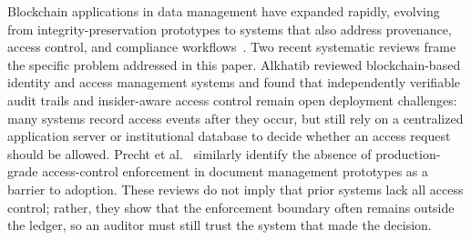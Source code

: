 \documentclass{ieeeaccess}
\begin{document}
Blockchain applications in data management have expanded rapidly, evolving from integrity-preservation prototypes to systems that also address provenance, access control, and compliance
workflows~\cite{jaoude2019blockchain,casino2019systematic}. Two recent systematic reviews frame the specific problem addressed in this paper. Alkhatib \cite{alkhatib2022towards} reviewed blockchain-based identity and access management systems and found that independently verifiable audit trails and insider-aware access control remain open deployment challenges: many systems record access events after they occur, but still rely on a centralized application server or institutional database to decide whether an access request should be allowed. Precht et al.~\cite{paperlessEverything2025} similarly identify the absence of production-grade access-control enforcement in document management prototypes as a barrier to adoption. These reviews do not
imply that prior systems lack all access control; rather, they show
that the enforcement boundary often remains outside the ledger, so an
auditor must still trust the system that made the decision.
\end{document}

